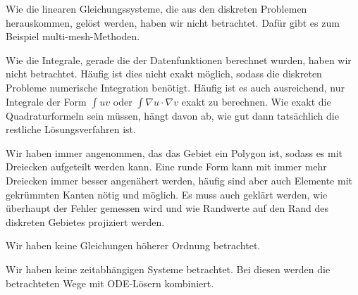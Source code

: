 Wie die linearen Gleichungssysteme, die aus den diskreten Problemen herauskommen, gelöst werden, haben wir nicht betrachtet.
Dafür gibt es zum Beispiel multi-mesh-Methoden.

Wie die Integrale, gerade die der Datenfunktionen berechnet wurden, haben wir nicht betrachtet.
Häufig ist dies nicht exakt möglich, sodass die diskreten Probleme numerische Integration benötigt.
Häufig ist es auch ausreichend, nur Integrale der Form $∫uv$ oder $∫∇u·∇v$ exakt zu berechnen.
Wie exakt die Quadraturformeln sein müssen, hängt davon ab, wie gut dann tatsächlich die restliche Lösungsverfahren ist.

Wir haben immer angenommen, das das Gebiet ein Polygon ist, sodass es mit Dreiecken aufgeteilt werden kann.
Eine runde Form kann mit immer mehr Dreiecken immer besser angenähert werden, häufig sind aber auch Elemente mit gekrümmten Kanten nötig und möglich.
Es muss auch geklärt werden, wie überhaupt der Fehler gemessen wird und wie Randwerte auf den Rand des diskreten Gebietes projiziert werden.

Wir haben keine Gleichungen höherer Ordnung betrachtet.

Wir haben keine zeitabhängigen Systeme betrachtet. Bei diesen werden die betrachteten Wege mit ODE-Lösern kombiniert.
